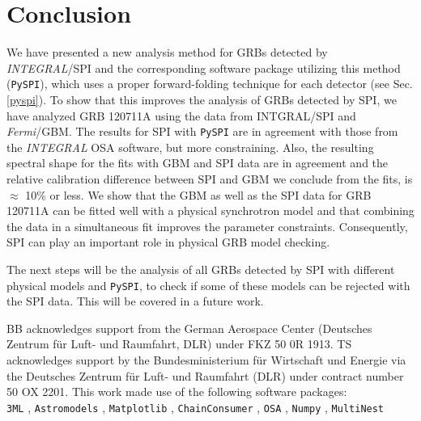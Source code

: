\documentclass[twocolumn,traditabstract]{aa}
\begin{document}
\section{Conclusion}
\label{conclusion}
We have presented a new analysis method for GRBs detected by \textit{INTEGRAL}/SPI and the corresponding software package utilizing this method ({\tt PySPI}), which uses a proper forward-folding technique for each detector (see Sec. \ref{pyspi}). To show that this improves the analysis of GRBs detected by SPI, we have analyzed GRB 120711A using the data from INTGRAL/SPI and \textit{Fermi}/GBM. The results for SPI with {\tt PySPI} are in agreement with those from the \textit{INTEGRAL} OSA software, but more constraining. Also, the resulting spectral shape for the fits with GBM and SPI data are in agreement and the relative calibration difference between SPI and GBM we conclude from the fits, is $\approx$ 10\% or less. We show that the GBM as well as the SPI data for GRB 120711A can be fitted well with a physical synchrotron model and that combining the data in a simultaneous fit improves the parameter constraints. Consequently, SPI can play an important role in physical GRB model checking.

The next steps will be the analysis of all GRBs detected by SPI with different physical models and {\tt PySPI}, to check if some of these models can be rejected with the SPI data. This will be covered in a future work.

\begin{acknowledgement}
BB acknowledges support from the German Aerospace Center (Deutsches Zentrum f\"ur Luft- und Raumfahrt, DLR) under FKZ 50 0R 1913. TS acknowledges support by the Bundesministerium f\"ur Wirtschaft und Energie via the Deutsches Zentrum f\"ur Luft- und Raumfahrt (DLR) under contract number 50 OX 2201.
This work made use of the following software packages:\\
{\tt 3ML} \citep{3ML}, {\tt Astromodels} \citep{astromodels}, {\tt Matplotlib} \citep{matplotlib}, {\tt ChainConsumer} \citep{chainconsumer, chainconsumer2}, {\tt OSA} \citep{osa}, {\tt Numpy} \citep{numpy}, {\tt MultiNest} \citep{multinest, multinest1, multinest3}
\end{acknowledgement}
\end{document}
